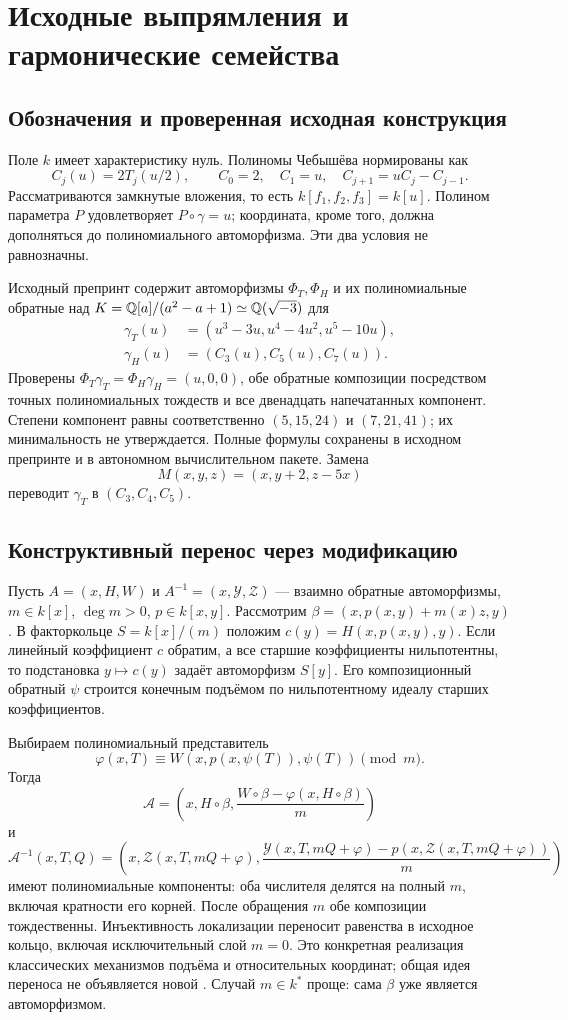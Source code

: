 \section{Исходные выпрямления и гармонические семейства}
\subsection{Обозначения и проверенная исходная конструкция}
Поле $k$ имеет характеристику нуль. Полиномы Чебышёва нормированы как
\[
C_j(u)=2T_j(u/2),\qquad C_0=2,\quad C_1=u,\quad C_{j+1}=uC_j-C_{j-1}.
\]
Рассматриваются замкнутые вложения, то есть $k[f_1,f_2,f_3]=k[u]$.
Полином параметра $P$ удовлетворяет $P\circ\gamma=u$; координата, кроме
того, должна дополняться до полиномиального автоморфизма. Эти два
условия не равнозначны.

Исходный препринт \cite{Repository} содержит автоморфизмы
$\Phi_T,\Phi_H$ и их полиномиальные обратные над
$K={\mathbb{Q}}[a]/(a^2-a+1)\simeq{\mathbb{Q}}(\sqrt{-3})$ для
\[
\begin{aligned}
\gamma_T(u)&=(u^3-3u,u^4-4u^2,u^5-10u),\\
\gamma_H(u)&=(C_3(u),C_5(u),C_7(u)).
\end{aligned}
\]
Проверены $\Phi_T\gamma_T=\Phi_H\gamma_H=(u,0,0)$, обе обратные
композиции посредством точных полиномиальных тождеств и все двенадцать
напечатанных компонент. Степени компонент равны соответственно
$(5,15,24)$ и $(7,21,41)$; их минимальность не утверждается.
Полные формулы сохранены в исходном препринте и в автономном
вычислительном пакете. Замена
\[
M(x,y,z)=(x,y+2,z-5x)
\]
переводит $\gamma_T$ в $(C_3,C_4,C_5)$.

\subsection{Конструктивный перенос через модификацию}
Пусть $A=(x,H,W)$ и $A^{-1}=(x,\mathcal Y,\mathcal Z)$ ---
взаимно обратные автоморфизмы, $m\in k[x]$, $\deg m>0$, $p\in k[x,y]$.
Рассмотрим $\beta=(x,p(x,y)+m(x)z,y)$. В факторкольце
$S=k[x]/(m)$ положим $c(y)=H(x,p(x,y),y)$.
Если линейный коэффициент $c$ обратим, а все старшие коэффициенты
нильпотентны, то подстановка $y\mapsto c(y)$ задаёт автоморфизм $S[y]$.
Его композиционный обратный $\psi$ строится
конечным подъёмом по нильпотентному идеалу старших коэффициентов.

Выбираем полиномиальный представитель
\[
\varphi(x,T)\equiv W(x,p(x,\psi(T)),\psi(T))\pmod m.
\]
Тогда
\[
\mathcal A=\left(x,H\circ\beta,
\frac{W\circ\beta-\varphi(x,H\circ\beta)}m\right)
\]
и
\[
\mathcal A^{-1}(x,T,Q)=
\left(x,\mathcal Z(x,T,mQ+\varphi),
\frac{\mathcal Y(x,T,mQ+\varphi)-p(x,\mathcal Z(x,T,mQ+\varphi))}m\right)
\]
имеют полиномиальные компоненты: оба числителя делятся на полный $m$,
включая кратности его корней. После обращения $m$ обе композиции
тождественны. Инъективность локализации переносит равенства в исходное
кольцо, включая исключительный слой $m=0$.
Это конкретная реализация классических механизмов подъёма и относительных
координат; общая идея переноса не объявляется новой \cite{EVM,Repository}.
Случай $m\in k^*$ проще: сама $\beta$ уже является автоморфизмом.

